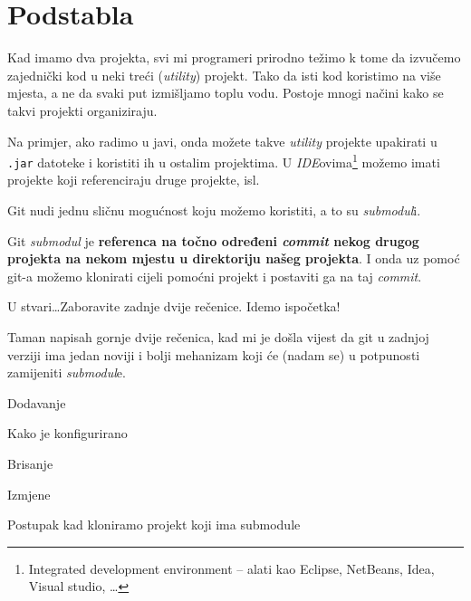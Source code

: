 \chapter*{Podstabla}

Kad imamo dva projekta, svi mi programeri prirodno težimo k tome da izvučemo zajednički kod u neki treći (\emph{utility}) projekt.
Tako da isti kod koristimo na više mjesta, a ne da svaki put izmišljamo toplu vodu.
Postoje mnogi načini kako se takvi projekti organiziraju.

Na primjer, ako radimo u javi, onda možete takve \emph{utility} projekte upakirati u \verb+.jar+ datoteke i koristiti ih u ostalim projektima.
U \emph{IDE}ovima\footnote{Integrated development environment -- alati kao Eclipse, NetBeans, Idea, Visual studio, \dots} možemo imati projekte koji referenciraju druge projekte, isl.

Git nudi jednu sličnu mogućnost koju možemo koristiti, a to su \emph{submodul}i.

Git \emph{submodul} je \textbf{referenca na točno određeni \emph{commit} nekog drugog projekta na nekom mjestu u direktoriju našeg projekta}.
I onda uz pomoć git-a možemo klonirati cijeli pomoćni projekt i postaviti ga na taj \emph{commit}.

U stvari\dots Zaboravite zadnje dvije rečenice. Idemo ispočetka!

Taman napisah gornje dvije rečenica, kad mi je došla vijest da git u zadnjoj verziji ima jedan noviji i bolji mehanizam koji će (nadam se) u potpunosti zamijeniti \emph{submodul}e.

\TODO Dodavanje

\TODO Kako je konfigurirano

\TODO Brisanje

\TODO Izmjene

\TODO Postupak kad kloniramo projekt koji ima submodule


